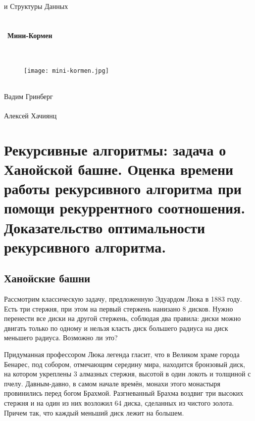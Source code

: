 \documentclass[a4paper,12pt]{article}
\begin{document}
\begin{titlepage}
  \begin{center}
  
  	{ и Структуры Данных}
	\\ \
	\\ \
	\\ \
	{\Huge \textbf{Мини-Кормен}}
    \\ \
    \\ \
    
    \begin{figure}[h]
    \begin{center}
        \begin{minipage}[h]{0.8\linewidth}
        \texttt{[image: mini-kormen.jpg]}
        \end{minipage}
    \end{center}
    \end{figure}
    \ \\
    
    {\Large Вадим Гринберг} \\ 
    \ \\ 
    {\Large Алексей Хачиянц} \\ 
   
\end{center}
\end{titlepage}

\tableofcontents

\newpage

\section{Рекурсивные алгоритмы: задача о Ханойской башне. Оценка времени работы 
рекурсивного алгоритма при помощи рекуррентного соотношения. Доказательство 
оптимальности рекурсивного алгоритма.}

\subsection{Ханойские башни}
Рассмотрим классическую задачу, предложенную Эдуардом Люка в 1883 году. Есть 
три стержня, при этом на первый стержень нанизано 8 дисков. Нужно перенести все 
диски на другой стержень, соблюдая два правила: диски можно двигать только по 
одному и нельзя класть
диск большего радиуса на диск меньшего радиуса. Возможно ли это?

Придуманная профессором Люка легенда гласит, что в Великом храме города Бенарес,
 под собором, отмечающим середину мира, находится бронзовый диск, на котором 
 укреплены 3 алмазных стержня, высотой в один локоть и толщиной с пчелу. 
 Давным-давно, в самом начале времён, монахи этого монастыря провинились перед 
 богом Брахмой. Разгневанный Брахма воздвиг три высоких стержня и на один из 
 них возложил 64 диска, сделанных из чистого золота. Причем так, что каждый 
 меньший диск лежит на большем.
\end{document}

